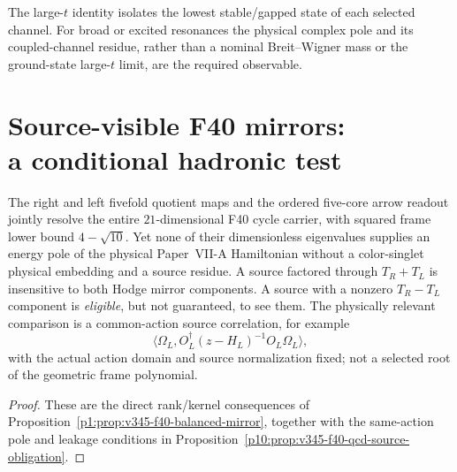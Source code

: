 \documentclass[12pt,a4paper]{article}
\begin{document}
\begin{remark}
The large-$t$ identity isolates the lowest stable/gapped state of
each selected channel.  For broad or excited resonances the
physical complex pole and its coupled-channel residue, rather than
a nominal Breit--Wigner mass or the ground-state large-$t$
limit, are the required observable.
\end{remark}


\clearpage
\section[Source-visible F40 mirrors: a conditional hadronic test]{Source-visible F40 mirrors:\\a conditional hadronic test}
\label{p11:sec:v345-f40-readout-hadrons}
\begin{proposition}
\label{p11:prop:v345-f40-no-mass-inference}
The right and left fivefold quotient maps and the ordered
five-core arrow readout jointly resolve the entire
$21$-dimensional F40 cycle carrier, with squared frame lower bound
$4-\sqrt{10}$.  Yet none of their dimensionless eigenvalues
supplies an energy pole of the physical Paper~VII-A Hamiltonian
without a color-singlet physical embedding and a source residue.
A source factored through $T_R+T_L$ is insensitive to both
Hodge mirror components.  A source with a nonzero
$T_R-T_L$ component is \emph{eligible}, but not guaranteed, to
see them.  The physically relevant comparison is a common-action
source correlation, for example
\[
 \langle\Omega_L,O_L^{\dagger}(z-H_L)^{-1}
 O_L\Omega_L\rangle,
\]
with the actual action domain and source normalization fixed;
not a selected root of the geometric frame polynomial.
\end{proposition}
\begin{proof}
These are the direct rank/kernel consequences of
Proposition~\ref{p1:prop:v345-f40-balanced-mirror}, together
with the same-action pole and leakage conditions in
Proposition~\ref{p10:prop:v345-f40-qcd-source-obligation}.
\end{proof}

\clearpage
\end{document}

